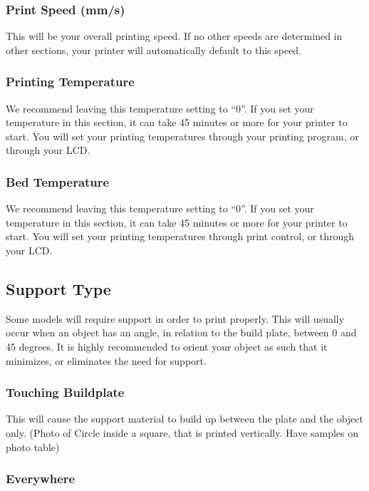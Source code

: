 \subsubsection{Print Speed (mm/s)}

This will be your overall printing speed. If no other speeds are determined in other sections, your printer will automatically default to this speed. 

\subsubsection{Printing Temperature}

We recommend leaving this temperature setting to “0”. If you set your temperature in this section, it can take 45 minutes or more for your printer to start. You will set your printing temperatures through your printing program, or through your LCD.

\subsubsection{Bed Temperature}

We recommend leaving this temperature setting to “0”. If you set your temperature in this section, it can take 45 minutes or more for your printer to start. You will set your printing temperatures through print control, or through your LCD.

\subsection{Support Type}

Some models will require support in order to print properly. This will usually occur when an object has an angle, in relation to the build plate, between 0 and 45 degrees. It is highly recommended to orient your object as such that it minimizes, or eliminates the need for support.

\subsubsection{Touching Buildplate}

This will cause the support material to build up between the plate and the object only. (Photo of Circle inside a square, that is printed vertically. Have samples on photo table)

\subsubsection{Everywhere}

